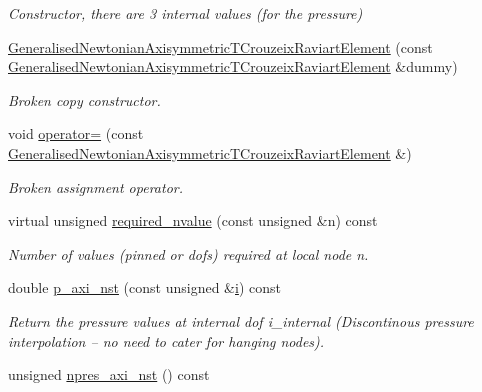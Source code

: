 \begin{DoxyCompactItemize}
\begin{DoxyCompactList}\small\item\em Constructor, there are 3 internal values (for the pressure) \end{DoxyCompactList}\item 
\hyperlink{classoomph_1_1GeneralisedNewtonianAxisymmetricTCrouzeixRaviartElement_af86fa307de97a0e17926385c5ef0fa31}{Generalised\+Newtonian\+Axisymmetric\+T\+Crouzeix\+Raviart\+Element} (const \hyperlink{classoomph_1_1GeneralisedNewtonianAxisymmetricTCrouzeixRaviartElement}{Generalised\+Newtonian\+Axisymmetric\+T\+Crouzeix\+Raviart\+Element} \&dummy)
\begin{DoxyCompactList}\small\item\em Broken copy constructor. \end{DoxyCompactList}\item 
void \hyperlink{classoomph_1_1GeneralisedNewtonianAxisymmetricTCrouzeixRaviartElement_a594a948cd66d768264c98f6a8281d96c}{operator=} (const \hyperlink{classoomph_1_1GeneralisedNewtonianAxisymmetricTCrouzeixRaviartElement}{Generalised\+Newtonian\+Axisymmetric\+T\+Crouzeix\+Raviart\+Element} \&)
\begin{DoxyCompactList}\small\item\em Broken assignment operator. \end{DoxyCompactList}\item 
virtual unsigned \hyperlink{classoomph_1_1GeneralisedNewtonianAxisymmetricTCrouzeixRaviartElement_a78a4865b53c8752ae2ac7700f29ea6a5}{required\+\_\+nvalue} (const unsigned \&n) const
\begin{DoxyCompactList}\small\item\em Number of values (pinned or dofs) required at local node n. \end{DoxyCompactList}\item 
double \hyperlink{classoomph_1_1GeneralisedNewtonianAxisymmetricTCrouzeixRaviartElement_ab474b6d16da6b1519632c8e64585b040}{p\+\_\+axi\+\_\+nst} (const unsigned \&\hyperlink{cfortran_8h_adb50e893b86b3e55e751a42eab3cba82}{i}) const
\begin{DoxyCompactList}\small\item\em Return the pressure values at internal dof i\+\_\+internal (Discontinous pressure interpolation -- no need to cater for hanging nodes). \end{DoxyCompactList}\item 
unsigned \hyperlink{classoomph_1_1GeneralisedNewtonianAxisymmetricTCrouzeixRaviartElement_ad42bb6148e35bd44bde015d501fc2a43}{npres\+\_\+axi\+\_\+nst} () const

\end{DoxyCompactItemize}
